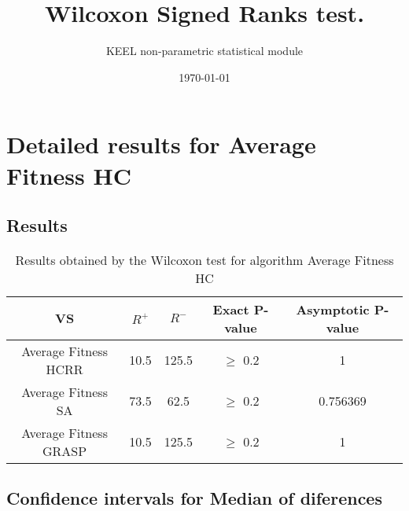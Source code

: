 \documentclass[a4paper,10pt]{article}
\title{Wilcoxon Signed Ranks test.}
\date{\today}
\author{KEEL non-parametric statistical module}
\begin{document}
\pagestyle{empty}
\maketitle
\thispagestyle{empty}



\section{Detailed results for Average Fitness HC      }


\subsection{Results}

\begin{table}[!htp]
\centering\small
\begin{tabular}{
|c|c|c|c|c|}
\hline
 VS & $R^{+}$ & $R^{-}$ & Exact P-value & Asymptotic P-value \\ \hline 
Average Fitness HCRR    & 10.5 & 125.5 & $\geq$ 0.2 & 1\\ \hline 
Average Fitness SA      & 73.5 & 62.5 & $\geq$ 0.2 & 0.756369\\ \hline 
Average Fitness GRASP & 10.5 & 125.5 & $\geq$ 0.2 & 1\\ \hline 

\end{tabular}
\caption{Results obtained by the Wilcoxon test for algorithm Average Fitness HC      }
\end{table}

\subsection{Confidence intervals for Median of diferences}
\end{document}
